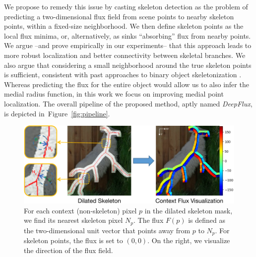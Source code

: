 \documentclass[10pt,twocolumn,letterpaper]{article}
\newcommand{\refsec}[1]{Section~\ref{#1}}
\newcommand{\reffig}[1]{Figure~\ref{#1}}
\begin{document}
We propose to remedy this issue by casting skeleton detection as the problem of predicting a two-dimensional flux field from scene points to nearby skeleton points, within a fixed-size neighborhood.
We then define skeleton points as the local flux minima, or, alternatively, as sinks ``absorbing'' flux from nearby points.
We argue --and prove empirically in our experiments-- that this approach leads to more robust localization and better connectivity between skeletal branches.
We also argue that considering a small neighborhood around the true skeleton points is sufficient, consistent with
past approaches to binary object skeletonization \cite{dimitrov2003}.
Whereas predicting the flux for the entire object would allow us to also infer the medial radius function, in this work we focus on improving medial point localization. The overall pipeline of the proposed method, aptly named \emph{DeepFlux}, is depicted in~\reffig{fig:pipeline}.


\begin{figure}
\centering
\includegraphics[width=0.98\linewidth]{figures/flux_gt_crop.pdf}
\vskip 0.2cm
\caption{For each context (non-skeleton) pixel $p$ in the dilated skeleton mask, we find its nearest skeleton pixel $N_p$. The flux $F(p)$ is defined as the two-dimensional unit vector that points away from $p$ to $N_p$. For skeleton points, the flux is set to $(0, 0)$. On the right, we visualize the direction of the flux field.}
\label{fig:directionfield}
\end{figure}
\end{document}
